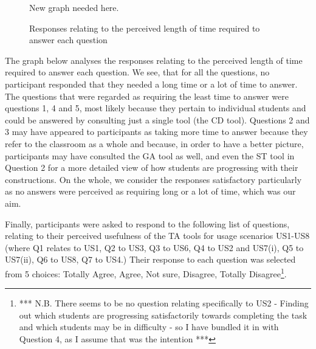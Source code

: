 \begin{figure}[htbp]
  \centering
  New graph needed here. 
  \caption{Responses relating to the perceived length of time required
    to answer each question} 
\label{fig:sjadsfnasdf}
\end{figure}

The graph below analyses the responses relating to the perceived
length of time required to answer each question. We see, that for all
the questions, no participant responded that they needed a long time
or a lot of time to answer. The questions that were regarded as
requiring the least time to answer were questions 1, 4 and 5, most
likely because they pertain to individual students and could be
answered by consulting just a single tool (the CD tool). Questions 2
and 3 may have appeared to participants as taking more time to answer
because they refer to the classroom as a whole and because, in order
to have a better picture, participants may have consulted the GA tool
as well, and even the ST tool in Question 2 for a more detailed view
of how students are progressing with their constructions. On the
whole, we consider the responses satisfactory particularly as no
answers were perceived as requiring long or a lot of time, which was
our aim. 

Finally, participants were asked to respond to the following list of
questions, relating to their perceived usefulness of the TA tools for
usage scenarios US1-US8 (where Q1 relates to US1, Q2 to US3, Q3 to
US6, Q4 to US2 and US7(i), Q5 to US7(ii), Q6 to US8, Q7 to US4.) Their
response to each question was selected from 5 choices: Totally Agree,
Agree, Not sure, Disagree, Totally Disagree\footnote{*** N.B. There
  seems to be no question relating specifically to US2 - Finding out
  which students are progressing satisfactorily towards completing the
  task and which students may be in difficulty - so I have bundled it
  in with Question 4, as  I assume that was the intention ***}.  


